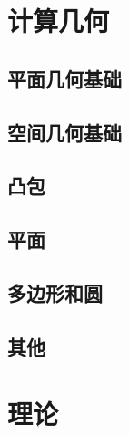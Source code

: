 \documentclass[12pt,a4paper,titlepage]{article}
\begin{document}
\section{\LARGE 计算几何}
	\subsection{平面几何基础}
    
    
    
    
    

	\subsection{空间几何基础}
    

	\subsection{凸包}
	
	
	
	
	

	\subsection{平面}

	\subsection{多边形和圆}

	\subsection{其他}

\section{\LARGE 理论}
\end{document}
